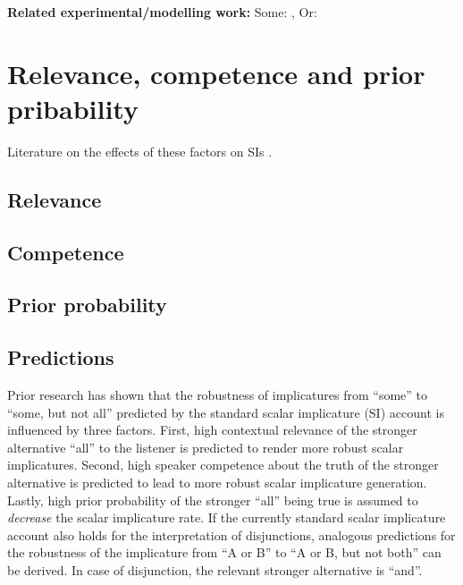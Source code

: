\documentclass{sp}
\begin{document}
\textbf{Related experimental/modelling work: } 
Some: \citep{degen2015investigating}, 
Or: \citep{Li2021}

\section{Relevance, competence and prior pribability}
Literature on the effects of these factors on SIs \citep{sperber1986relevance, goodman2013knowledge, degen2015wonky}. 
\subsection{Relevance}

\subsection{Competence}

\subsection{Prior probability}

\subsection{Predictions}
Prior research has shown that the robustness of implicatures from ``some'' to ``some, but not all''  predicted by the standard scalar implicature (SI) account is influenced by three factors. First, high contextual relevance of the stronger alternative ``all'' to the listener is predicted to render more robust scalar implicatures. Second, high speaker competence about the truth of the stronger alternative is predicted to lead to more robust scalar implicature generation. Lastly, high prior probability of the stronger ``all'' being true is assumed to \textit{decrease} the scalar implicature rate.
If the currently standard scalar implicature account also holds for the interpretation of disjunctions, analogous predictions for the robustness of the implicature from ``A or B'' to ``A or B, but not both'' can be derived. In case of disjunction, the relevant stronger alternative is ``and''. 
\end{document}
